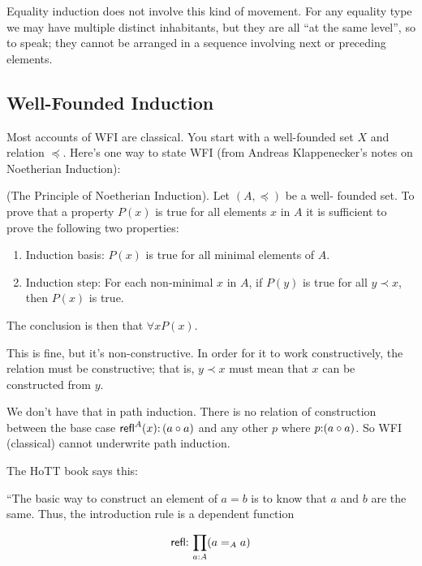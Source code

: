 \documentclass{article}
\begin{document}
Equality induction does not involve this kind of movement.  For any
equality type we may have multiple distinct inhabitants, but they are
all ``at the same level'', so to speak; they cannot be arranged in a
sequence involving next or preceding elements.

\subsection{Well-Founded Induction}

 Most accounts of WFI are classical.  You start with a well-founded
 set \(X\) and relation \(\preceq\).  Here's one way to state WFI (from
 Andreas Klappenecker's notes on Noetherian Induction):

 \begin{theorem}
   (The Principle of Noetherian Induction). Let \((A,\preceq)\) be a well-
   founded set. To prove that a property \(P(x)\) is true for all
   elements \(x\) in \(A\) it is sufficient to prove the following two
   properties:
   \begin{enumerate}
   \item Induction basis: \(P(x)\) is true for all minimal elements of \(A\).
   \item Induction step: For each non-minimal \(x\) in \(A\), if
     \(P(y)\) is true for all \(y\prec x\), then \(P(x)\) is true.
   \end{enumerate}
\end{theorem}

The conclusion is then that \(\forall x P(x)\).

This is fine, but it's non-constructive.  In order for it to work
constructively, the relation must be constructive; that is, \(y\prec
x\) must mean that \(x\) can be constructed from \(y\).

We don't have that in path induction.  There is no relation of
construction between the base case \(\textsf{refl}^A(x){:}\,(a\circ a)\) and any
other \(p\) where \(p{:}(a\circ a)\).  So WFI (classical) cannot underwrite
path induction.

\bigskip

The HoTT book says this:

``The basic way to construct an element of \(a = b\) is to know that
\(a\) and \(b\) are the same. Thus, the introduction rule is a
dependent function

\begin{align}
  \textsf{refl}{:}\,\prod\limits_{a:A}(a=_Aa)
\end{align}
\end{document}
